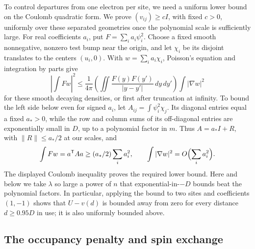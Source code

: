 To control departures from one electron per site, we need a uniform
lower bound on the Coulomb quadratic form. We prove
\((v_{ij})\ge cI\), with fixed \(c>0\), uniformly over these separated
geometries once the polynomial scale is sufficiently large. For real
coefficients \(a_i\), put \(F=\sum_i a_i\psi_i^2\). Choose a fixed
smooth nonnegative, nonzero test bump near the origin, and let
\(\chi_i\) be its disjoint translates to the centers \((u_i,0)\).
With \(w=\sum_i a_i\chi_i\), Poisson's equation and integration by
parts give
\[
 \left|\int Fw\right|^2\le
 \frac1{4\pi}\left(\iint\frac{F(y)F(y')}{|y-y'|}\,dy\,dy'\right)
       \int|\nabla w|^2
\]
for these smooth decaying densities, or first after truncation at
infinity. To bound the left side below even for signed \(a_i\), let
\(A_{ij}=\int\psi_i^2\chi_j\). Its diagonal entries equal a fixed
\(a_*>0\), while the row and column sums of its off-diagonal entries
are exponentially small in \(D\), up to a polynomial factor in \(m\).
Thus \(A=a_*I+R\), with \(\|R\|\le a_*/2\) at our scales, and
\[
       \int Fw=a^{\mathsf T}Aa\ge(a_*/2)\sum_i a_i^2,
       \qquad \int|\nabla w|^2=O\Bigl(\sum_i a_i^2\Bigr).
\]
The displayed Coulomb inequality proves the required lower bound.
Here and below we take \(\lambda\) so large a power of \(n\) that
exponential-in-\(-D\) bounds beat the polynomial factors. In particular,
applying the bound to two sites and coefficients \((1,-1)\) shows that
\(U-v(d)\) is bounded away from zero for every distance
\(d\ge0.95D\) in use; it is also uniformly bounded above.

\subsection{The occupancy penalty and spin exchange}\label{subsec:finite-fermion}


